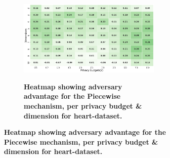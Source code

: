 \begin{figure}[H]
\begin{subfigure}[b]{0.85\textwidth}
        \begin{subfigure}[c]{1\textwidth}
            \caption{\textbf{Heatmap showing adversary advantage for the Piecewise mechanism, per privacy budget \& dimension for heart-dataset.}}
            \includegraphics[width=1\textwidth]{Results/kd-laplace/piecewise/heart-dataset/shokri_mi_adv.png}
            \label{fig:privacy_heart-dataset_adversial_advantage_piecewise}
        \end{subfigure}
    \end{subfigure}
    \hfill %
    \begin{subfigure}[b]{0.075\textwidth}

\end{subfigure}
\end{figure}
